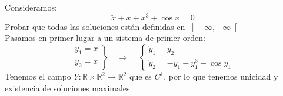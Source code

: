 \documentclass[12pt]{article}
\begin{document}
    \newpage
    \begin{ejercicio}
        Consideramos:
        \begin{equation*}
            \ddot{x} + x + x^3 + \cos x = 0
        \end{equation*}
        Probar que todas las soluciones están definidas en $\left]-\infty,+\infty\right[$\\

        \noindent
        Pasamos en primer lugar a un sistema de primer orden:
        \begin{equation*}
            \left.\begin{array}{l}
                y_1 = x \\
                y_2 = \dot{x}
            \end{array}\right\} \quad\Longrightarrow\quad \left\{\begin{array}{l}
                \dot{y}_1 = y_2 \\
                \dot{y}_2 = -y_1-y_1^3 -\cos y_1
            \end{array}\right.
        \end{equation*}
        Tenemos el campo $Y:\mathbb{R}\times\mathbb{R}^2\to\mathbb{R}^2$ que es $C^1$, por lo que tenemos unicidad y existencia de soluciones maximales.\\ 


\end{ejercicio}
\end{document}

